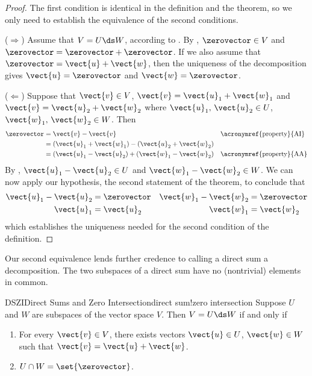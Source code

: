 \begin{proof}
The first condition is identical in the definition and the theorem, so we only need to establish the equivalence of the second conditions.\par
%
($\Rightarrow$)  
Assume that $V=U\ds W$, according to .   By , $\zerovector\in V$ and $\zerovector=\zerovector+\zerovector$.  If we also assume that $\zerovector=\vect{u}+\vect{w}$, then the uniqueness of the decomposition gives $\vect{u}=\zerovector$ and $\vect{w}=\zerovector$.\par
%
($\Leftarrow$)  
Suppose that $\vect{v}\in V$, $\vect{v}=\vect{u}_1+\vect{w}_1$ and $\vect{v}=\vect{u}_2+\vect{w}_2$ where $\vect{u}_1,\,\vect{u}_2\in U$, $\vect{w}_1,\,\vect{w}_2\in W$.  Then
%
\begin{align*}
\zerovector 
&=\vect{v}-\vect{v}&&\text{\acronymref{property}{AI}}\\
&=\left(\vect{u}_1+\vect{w}_1\right)-\left(\vect{u}_2+\vect{w}_2\right)\\
&=\left(\vect{u}_1-\vect{u}_2\right)+\left(\vect{w}_1-\vect{w}_2\right)&&\text{\acronymref{property}{AA}}
\end{align*}
%
By , $\vect{u}_1-\vect{u}_2\in U$ and $\vect{w}_1-\vect{w}_2\in W$.  We can now apply our hypothesis, the second statement of the theorem, to conclude that 
%
\begin{align*}
\vect{u}_1-\vect{u}_2&=\zerovector & \vect{w}_1-\vect{w}_2&=\zerovector\\
\vect{u}_1&=\vect{u}_2 & \vect{w}_1&=\vect{w}_2\\
\end{align*}
%
which establishes the uniqueness needed for the second condition of the definition.
%
\end{proof}
%
Our second equivalence lends further credence to calling a direct sum a decomposition.  The two subspaces of a direct sum have no (nontrivial) elements in common.
%
\begin{theorem}{DSZI}{Direct Sums and Zero Intersection}{direct sum!zero intersection}
Suppose $U$ and $W$ are subspaces of the vector space $V$.  Then $V=U\ds W$ if and only if
\begin{enumerate}
\item  For every $\vect{v}\in V$, there exists vectors $\vect{u}\in U$, $\vect{w}\in W$ such that $\vect{v}=\vect{u}+\vect{w}$.
%
\item $U\cap W=\set{\zerovector}$.
\end{enumerate}
\end{theorem}

